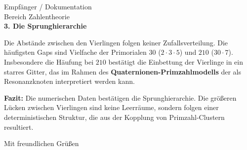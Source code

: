 \documentclass[fontsize=12pt, paper=a4]{scrlttr2}
\begin{document}
\begin{letter}{Empfänger / Dokumentation \\ Bereich Zahlentheorie \\ }
		\medskip
		\textbf{3. Die Sprunghierarchie}
		\smallskip
		
		Die Abstände zwischen den Vierlingen folgen keiner Zufallsverteilung. Die häufigsten Gaps sind Vielfache der Primorialen $30$ ($2 \cdot 3 \cdot 5$) und $210$ ($30 \cdot 7$). Insbesondere die Häufung bei $210$ bestätigt die Einbettung der Vierlinge in ein starres Gitter, das im Rahmen des \textbf{Quaternionen-Primzahlmodells} der als Resonanzknoten interpretiert werden kann.
		
		\medskip
		\textbf{Fazit:}
		Die numerischen Daten bestätigen die Sprunghierarchie. Die größeren Lücken zwischen Vierlingen sind keine Leerräume, sondern folgen einer deterministischen Struktur, die aus der Kopplung von Primzahl-Clustern resultiert.
		
		\closing{Mit freundlichen Grüßen}
		
	\end{letter}
\end{document}
